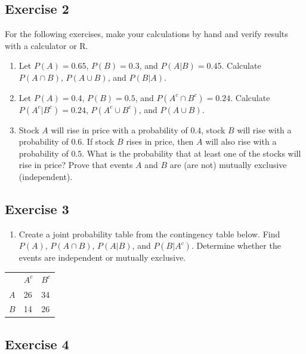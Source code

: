 \documentclass[
  letterpaper,
  DIV=11,
  numbers=noendperiod]{scrreprt}
\providecommand{\tightlist}{%
  \setlength{\itemsep}{0pt}\setlength{\parskip}{0pt}}\usepackage{longtable,booktabs,array}
\begin{document}
\hypertarget{exercise-2-14}{%
\subsection*{Exercise 2}\label{exercise-2-14}}

For the following exercises, make your calculations by hand and verify
results with a calculator or R.

\begin{enumerate}
\def\labelenumi{\arabic{enumi}.}
\item
  Let \(P(A)=0.65\), \(P(B)=0.3\), and \(P(A|B)=0.45\). Calculate
  \(P(A \cap B)\), \(P(A \cup B)\), and \(P(B|A)\).
\item
  Let \(P(A)=0.4\), \(P(B)=0.5\), and \(P(A^c \cap B^c)=0.24\).
  Calculate \(P(A^c|B^c)=0.24\), \(P(A^c \cup B^c)\), and
  \(P(A \cup B)\).
\item
  Stock \(A\) will rise in price with a probability of \(0.4\), stock
  \(B\) will rise with a probability of \(0.6\). If stock \(B\) rises in
  price, then \(A\) will also rise with a probability of \(0.5\). What
  is the probability that at least one of the stocks will rise in price?
  Prove that events \(A\) and \(B\) are (are not) mutually exclusive
  (independent).
\end{enumerate}

\hypertarget{exercise-3-14}{%
\subsection*{Exercise 3}\label{exercise-3-14}}

\begin{enumerate}
\def\labelenumi{\arabic{enumi}.}
\tightlist
\item
  Create a joint probability table from the contingency table below.
  Find \(P(A)\), \(P(A \cap B)\), \(P(A|B)\), and \(P(B|A^c)\).
  Determine whether the events are independent or mutually exclusive.
\end{enumerate}

\begin{longtable}[]{@{}lll@{}}
\toprule()
\endhead
& \(A^c\) & \(B^c\) \\
\(A\) & 26 & 34 \\
\(B\) & 14 & 26 \\
\bottomrule()
\end{longtable}

\hypertarget{exercise-4-4}{%
\subsection*{Exercise 4}\label{exercise-4-4}}
\end{document}
